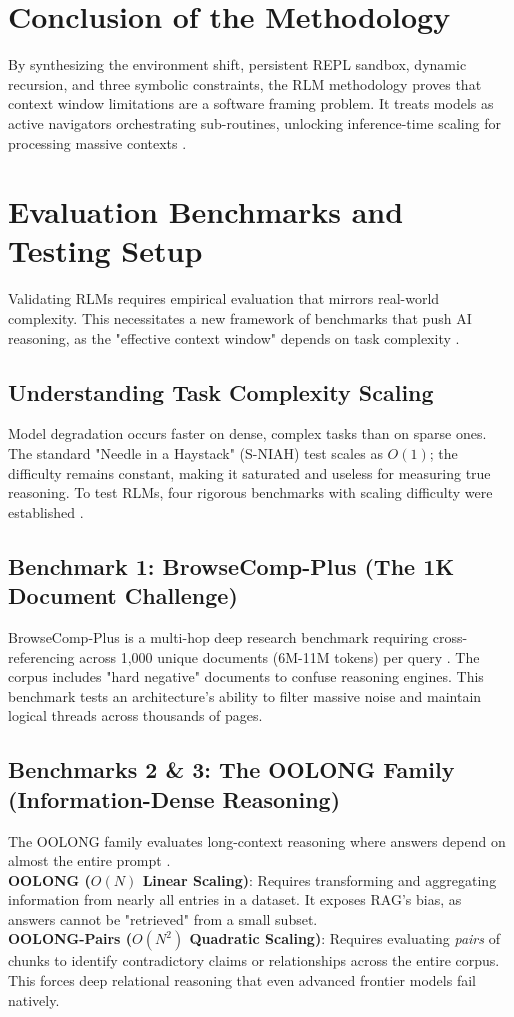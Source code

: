 \section{Conclusion of the Methodology}
By synthesizing the environment shift, persistent REPL sandbox, dynamic recursion, and three symbolic constraints, the RLM methodology proves that context window limitations are a software framing problem. It treats models as active navigators orchestrating sub-routines, unlocking inference-time scaling for processing massive contexts \cite{zhang2025}.

\section{Evaluation Benchmarks and Testing Setup}
Validating RLMs requires empirical evaluation that mirrors real-world complexity. This necessitates a new framework of benchmarks that push AI reasoning, as the "effective context window" depends on task complexity \cite{hsieh2024, bertsch2025}.

\subsection{Understanding Task Complexity Scaling}
Model degradation occurs faster on dense, complex tasks than on sparse ones. The standard "Needle in a Haystack" (S-NIAH) test scales as $O(1)$; the difficulty remains constant, making it saturated and useless for measuring true reasoning. To test RLMs, four rigorous benchmarks with scaling difficulty were established \cite{chen2025, bertsch2025, bai2025}.



\subsection{Benchmark 1: BrowseComp-Plus (The 1K Document Challenge)}
BrowseComp-Plus is a multi-hop deep research benchmark requiring cross-referencing across 1,000 unique documents (6M-11M tokens) per query \cite{chen2025}. The corpus includes "hard negative" documents to confuse reasoning engines. This benchmark tests an architecture's ability to filter massive noise and maintain logical threads across thousands of pages.


\subsection{Benchmarks 2 \& 3: The OOLONG Family (Information-Dense Reasoning)}
\noindent The OOLONG family evaluates long-context reasoning where answers depend on almost the entire prompt \cite{bertsch2025}. \\
\textbf{OOLONG ($O(N)$ Linear Scaling)}: Requires transforming and aggregating information from nearly all entries in a dataset. It exposes RAG's bias, as answers cannot be "retrieved" from a small subset. \\
\textbf{OOLONG-Pairs ($O(N^2)$ Quadratic Scaling)}: Requires evaluating \textit{pairs} of chunks to identify contradictory claims or relationships across the entire corpus. This forces deep relational reasoning that even advanced frontier models fail natively.



